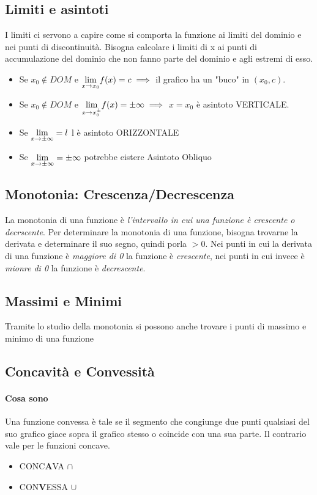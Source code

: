 \documentclass[12pt, a4paper, openany]{book}
\begin{document}
\subsection*{Limiti e asintoti}
I limiti ci servono a capire come si comporta la funzione ai limiti del dominio e nei punti di discontinuità.
Bisogna calcolare i limiti di x ai punti di accumulazione del dominio che non fanno parte del dominio e agli estremi di esso.

\begin{itemize}
	\item Se $x_0 \notin DOM$ e $\underset{x \to x_0}{\lim} f(x) = c \implies$ il grafico ha un "buco" in $(x_0,c)$.
 \item Se $x_0 \notin DOM$ e $\underset{x \to x_{0}^\pm}{\lim} f(x) = \pm \infty \implies$ $x=x_0$ è asintoto VERTICALE.
 \item Se $\underset{x \to \pm \infty}{\lim} = l$ l è asintoto ORIZZONTALE
 \item Se $\underset{x \to \pm \infty}{\lim} = \pm \infty$ potrebbe eistere Asintoto Obliquo
\end{itemize}
\subsection*{Monotonia: Crescenza/Decrescenza}
La monotonia di una funzione è \emph{l'intervallo in cui una funzione è crescente o decrscente}.
Per determinare la monotonia di una funzione, bisogna trovarne la derivata e determinare il suo segno, quindi porla $>0$.
Nei punti in cui la derivata di una funzione è \emph{maggiore di 0} la funzione è \emph{crescente}, nei punti in cui invece è \emph{mionre di 0} la funzione è \emph{decrescente}.

\subsection*{Massimi e Minimi}
Tramite lo studio della monotonia si possono anche trovare i punti di massimo e minimo di una funzione %

\subsection*{Concavità e Convessità}
\paragraph*{Cosa sono} Una funzione convessa è tale se il segmento che congiunge due punti qualsiasi del suo grafico giace 
sopra il grafico stesso o coincide con una sua parte. Il contrario vale per le funzioni concave.
\begin{itemize}
	\item CONC\textbf{A}VA $\cap$
	\item CON\textbf{V}ESSA $\cup$
\end{itemize}
\end{document}

